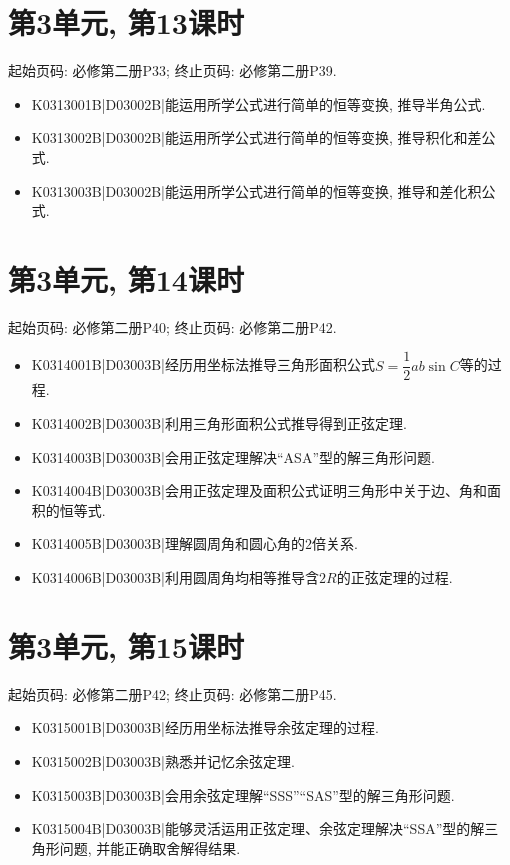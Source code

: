 \section*{第3单元, 第13课时}
起始页码: 必修第二册P33; 终止页码: 必修第二册P39.
\begin{itemize}
\item K0313001B|D03002B|能运用所学公式进行简单的恒等变换, 推导半角公式.
\item K0313002B|D03002B|能运用所学公式进行简单的恒等变换, 推导积化和差公式.
\item K0313003B|D03002B|能运用所学公式进行简单的恒等变换, 推导和差化积公式.
\end{itemize}

\section*{第3单元, 第14课时}
起始页码: 必修第二册P40; 终止页码: 必修第二册P42.
\begin{itemize}
\item K0314001B|D03003B|经历用坐标法推导三角形面积公式$S=\dfrac{1}{2}ab\sin C$等的过程.
\item K0314002B|D03003B|利用三角形面积公式推导得到正弦定理.
\item K0314003B|D03003B|会用正弦定理解决``ASA''型的解三角形问题.
\item K0314004B|D03003B|会用正弦定理及面积公式证明三角形中关于边、角和面积的恒等式.
\item K0314005B|D03003B|理解圆周角和圆心角的$2$倍关系.
\item K0314006B|D03003B|利用圆周角均相等推导含$2R$的正弦定理的过程.
\end{itemize}

\section*{第3单元, 第15课时}
起始页码: 必修第二册P42; 终止页码: 必修第二册P45.
\begin{itemize}
\item K0315001B|D03003B|经历用坐标法推导余弦定理的过程.
\item K0315002B|D03003B|熟悉并记忆余弦定理.
\item K0315003B|D03003B|会用余弦定理解``SSS''``SAS''型的解三角形问题.
\item K0315004B|D03003B|能够灵活运用正弦定理、余弦定理解决``SSA''型的解三角形问题, 并能正确取舍解得结果.
\end{itemize}

